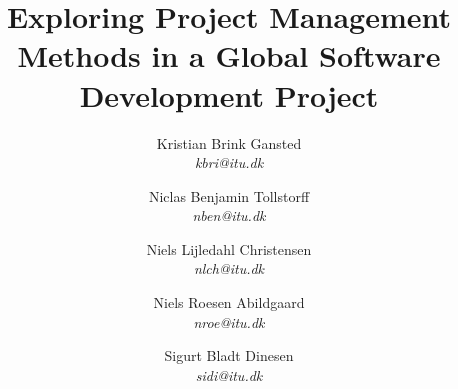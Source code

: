 \title{Exploring Project Management Methods in a Global Software Development Project}
\author{Kristian Brink Gansted\\ \emph{kbri@itu.dk}
    \and Niclas Benjamin Tollstorff\\ \emph{nben@itu.dk}
    \and Niels Lijledahl Christensen\\ \emph{nlch@itu.dk}
    \and Niels Roesen Abildgaard\\ \emph{nroe@itu.dk}
    \and Sigurt Bladt Dinesen\\ \emph{sidi@itu.dk}}

\maketitle